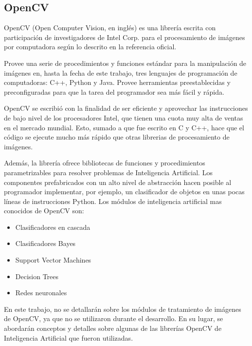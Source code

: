 \documentclass[a4paper,12pt,oneside,spanish]{book}
\begin{document}
\subsection{OpenCV}

OpenCV (Open Computer Vision, en inglés) es una librería escrita con participación de investigadores de Intel Corp. para el procesamiento de imágenes por computadora según lo descrito en la referencia oficial. \par 

Provee una serie de procedimientos y funciones estándar para la manipulación de imágenes en, hasta la fecha de este trabajo, tres lenguajes de programación de computadoras: C++,  Python y Java. Provee herramientas preestablecidas y preconfiguradas para que la tarea del programador sea más fácil y rápida. \par

OpenCV se escribió con la finalidad de ser eficiente y aprovechar las instrucciones de bajo nivel de los procesadores Intel, que tienen una cuota muy alta de ventas en el mercado mundial. Esto, sumado a que fue escrito en C y C++, hace que el código se ejecute mucho más rápido que otras librerias de procesamiento de imágenes.\par

Además, la librería ofrece bibliotecas de funciones y procedimientos parametrizables para resolver problemas de Inteligencia Artificial. Los componentes prefabricados con un alto nivel de abstracción hacen posible al programador implementar, por ejemplo, un clasificador de objetos en unas pocas líneas de instrucciones Python. Los módulos de inteligencia artificial mas conocidos de OpenCV son:\par
\begin{itemize}
	\setlength\itemsep{-0.2em}
	\item Clasificadores en cascada	
	\item Clasificadores Bayes
	\item Support Vector Machines
	\item Decision Trees 
	\item Redes neuronales 
\end{itemize}

En este trabajo, no se detallarán sobre los módulos de tratamiento de imágenes de OpenCV, ya que no se utilizaron durante el desarrollo. En su lugar, se abordarán conceptos y detalles sobre algunas de las librerías OpenCV de Inteligencia Artificial que fueron utilizadas.\par
\end{document}
